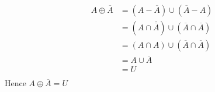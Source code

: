 \documentclass[12pt letter]{report}
\begin{document}
{\begin{enumerate}
          \begin{align*}
            A \oplus \overline{A} & = \left( A - \overline{A} \right) \cup \left( \overline{A} - A \right)
            \tag*{Definition of Symmetric Difference}                                                                                     \\
                                  & = \left( A \cap \overline{\overline{A}} \right) \cup \left( \overline{A} \cap \overline{A} \right)
            \tag*{Definition of Difference}                                                                                               \\
                                  & = \left( A \cap A \right) \cup \left( \overline{A} \cap \overline{A} \right) \tag*{By Complementation
            Law}                                                                                                                          \\
                                  & = A \cup \overline{A} \tag*{By Second Idempotent Law}                                                 \\
                                  & = U \tag*{By First Complement Law}                                                                    \\
          \end{align*}
          Hence $A \oplus \overline{A} = U$
  \end{enumerate}
}




\sol{
  \begin{enumerate}
    \item
          \[
            \mathcal{P}\left(\{a,b\}   \right) = \{\O, \{a\}, \{b\}, \{a,b\}   \}
          \]
    \item
          \[
            \mathcal{P}\left( \{\O, \{\O\} \}  \right) = \{\O, \{\O\}, \{\{\O\} \}, \{\O, \{\O\} \}   \}
          \]
  \end{enumerate}
}
\end{document}
